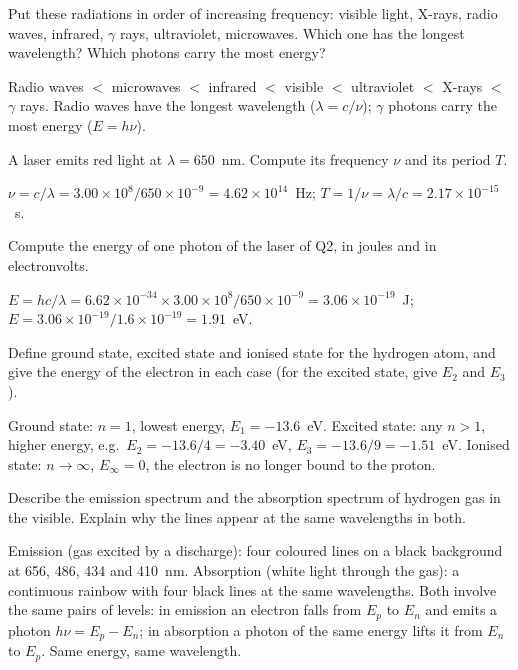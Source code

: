
Put these radiations in order of increasing frequency: visible light, X-rays, radio waves, infrared,
$\gamma$ rays, ultraviolet, microwaves. Which one has the longest wavelength? Which photons carry the
most energy?
\begin{solution}
Radio waves $<$ microwaves $<$ infrared $<$ visible $<$ ultraviolet $<$ X-rays $<$ $\gamma$ rays.
Radio waves have the longest wavelength ($\lambda = c/\nu$); $\gamma$ photons carry the most energy
($E = h\nu$).
\end{solution}

A laser emits red light at $\lambda = 650$~nm. Compute its frequency $\nu$ and its period $T$.
\begin{solution}
$\nu = c/\lambda = 3.00\times10^8/650\times10^{-9} = 4.62\times10^{14}$~Hz;\quad
$T = 1/\nu = \lambda/c = 2.17\times10^{-15}$~s.
\end{solution}

Compute the energy of one photon of the laser of Q2, in joules and in electronvolts.
\begin{solution}
$E = hc/\lambda = 6.62\times10^{-34}\times3.00\times10^8/650\times10^{-9} = 3.06\times10^{-19}$~J;\quad
$E = 3.06\times10^{-19}/1.6\times10^{-19} = 1.91$~eV.
\end{solution}

Define ground state, excited state and ionised state for the hydrogen atom, and give the energy
of the electron in each case (for the excited state, give $E_2$ and $E_3$).
\begin{solution}
Ground state: $n = 1$, lowest energy, $E_1 = -13.6$~eV. Excited state: any $n > 1$, higher energy,
e.g.\ $E_2 = -13.6/4 = -3.40$~eV, $E_3 = -13.6/9 = -1.51$~eV. Ionised state: $n\to\infty$,
$E_\infty = 0$, the electron is no longer bound to the proton.
\end{solution}

Describe the emission spectrum and the absorption spectrum of hydrogen gas in the visible. Explain
why the lines appear at the same wavelengths in both.
\begin{solution}
Emission (gas excited by a discharge): four coloured lines on a black background at 656, 486, 434
and 410~nm. Absorption (white light through the gas): a continuous rainbow with four black lines at
the same wavelengths. Both involve the same pairs of levels: in emission an electron falls from $E_p$
to $E_n$ and emits a photon $h\nu = E_p - E_n$; in absorption a photon of the same energy lifts it from
$E_n$ to $E_p$. Same energy, same wavelength.
\end{solution}


